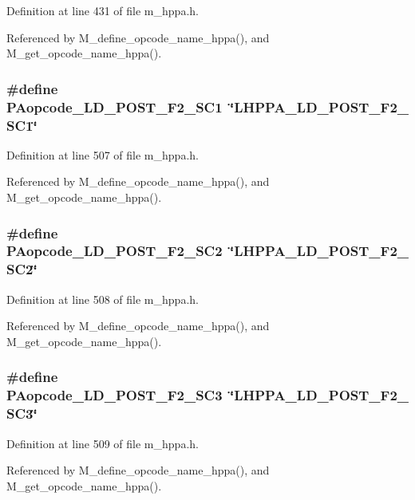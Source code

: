 Definition at line 431 of file m\_\-hppa.h.

Referenced by M\_\-define\_\-opcode\_\-name\_\-hppa(), and M\_\-get\_\-opcode\_\-name\_\-hppa().
\subsubsection{\setlength{\rightskip}{0pt plus 5cm}\#define PAopcode\_\-LD\_\-POST\_\-F2\_\-SC1~\char`\"{}LHPPA\_\-LD\_\-POST\_\-F2\_\-SC1\char`\"{}}\label{m__hppa_8h_75f0400803c1d48fb9c9053123e8f20b}




Definition at line 507 of file m\_\-hppa.h.

Referenced by M\_\-define\_\-opcode\_\-name\_\-hppa(), and M\_\-get\_\-opcode\_\-name\_\-hppa().
\subsubsection{\setlength{\rightskip}{0pt plus 5cm}\#define PAopcode\_\-LD\_\-POST\_\-F2\_\-SC2~\char`\"{}LHPPA\_\-LD\_\-POST\_\-F2\_\-SC2\char`\"{}}\label{m__hppa_8h_c777af3b48633027c587e81afcbf12e9}




Definition at line 508 of file m\_\-hppa.h.

Referenced by M\_\-define\_\-opcode\_\-name\_\-hppa(), and M\_\-get\_\-opcode\_\-name\_\-hppa().
\subsubsection{\setlength{\rightskip}{0pt plus 5cm}\#define PAopcode\_\-LD\_\-POST\_\-F2\_\-SC3~\char`\"{}LHPPA\_\-LD\_\-POST\_\-F2\_\-SC3\char`\"{}}\label{m__hppa_8h_3bf78e8a3b1530b2a0baa19e2dcb6fbf}




Definition at line 509 of file m\_\-hppa.h.

Referenced by M\_\-define\_\-opcode\_\-name\_\-hppa(), and M\_\-get\_\-opcode\_\-name\_\-hppa().
